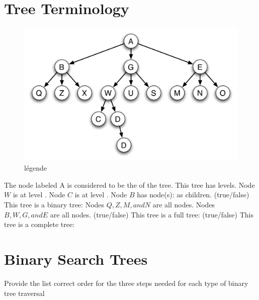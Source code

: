 \documentclass[11pt]{exam}
\begin{document}
\begin{questions}

\section*{Tree Terminology}
\begin{figure}[htbp]
   \begin{centering}
      \includegraphics[width=6in]{exam2_tree}
   \end{centering}
   \caption{légende}
   \label{fig:étiquette}
\end{figure}


\question[2] The node labeled A is considered to be the \makebox[1.5in]{\hrulefill} of the tree.
\question[2] This tree has \makebox[2in]{\hrulefill} levels.
\question[2] Node $W$ is at level \makebox[2in]{\hrulefill}.
\question[2] Node $C$ is at level \makebox[2in]{\hrulefill}.
\question[2] Node $B$ has node(s): \makebox[2in]{\hrulefill} as children.
\question[2] (true/false) This tree is a binary tree: \makebox[2in]{\hrulefill}
\question[2] Nodes $Q, Z, M, and N$ are all \makebox[2in]{\hrulefill} nodes.
\question[2] Nodes $B, W, G, and E$ are all \makebox[2in]{\hrulefill} nodes.
\question[2] (true/false) This tree is a full tree: \makebox[2in]{\hrulefill}
\question[2] (true/false) This tree is a complete tree: \makebox[2in]{\hrulefill}

\newpage
\section*{Binary Search Trees}
\question Provide the list correct order for the three steps needed for each type of binary tree traversal
\begin{parts}

\end{parts}
\end{questions}
\end{document}
